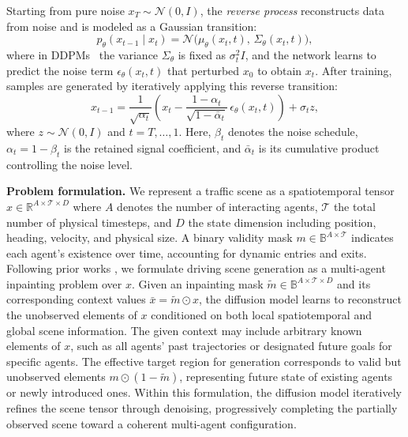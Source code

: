 \documentclass[10pt,twocolumn,letterpaper]{article}
\theoremstyle{plain}
\theoremstyle{remark}
\renewcommand{\paragraph}[1]{\vspace{.5em}\noindent\textbf{#1.}}
\begin{document}
Starting from pure noise $x_T \!\sim\! \mathcal{N}(0,I)$, the \textit{reverse process} reconstructs data from noise and is modeled as a Gaussian transition:
\begin{equation}
p_\theta(x_{t-1}\mid x_t)
= \mathcal{N}\!\big(\mu_\theta(x_t, t),\, \Sigma_\theta(x_t, t)\big),
\end{equation}
where in DDPMs~\cite{ho2020denoising} the variance $\Sigma_\theta$ is fixed as $\sigma_t^2 I$, 
and the network learns to predict the noise term $\epsilon_\theta(x_t, t)$ that perturbed $x_0$ to obtain $x_t$.
After training, samples are generated by iteratively applying this reverse transition:
\begin{equation}
x_{t-1}
= \frac{1}{\sqrt{\alpha_t}}
\!\left(x_t - \frac{1 - \alpha_t}{\sqrt{1 - \bar{\alpha}_t}}\,
\epsilon_\theta(x_t, t)\!\right)
+ \sigma_t z,
\label{eq:ddpm_sample}
\end{equation}
where $z \sim \mathcal{N}(0, I)$ and $t = T, \ldots, 1$. Here, $\beta_t$ denotes the noise schedule, $\alpha_t = 1 - \beta_t$ is the retained signal coefficient, and $\bar{\alpha}_t$ is its cumulative product controlling the noise level.

\paragraph{Problem formulation}
We represent a traffic scene as a spatiotemporal tensor \( x \in \mathbb{R}^{A \times \mathcal{T} \times D} \)
where \( A \) denotes the number of interacting agents, \( \mathcal{T} \) the total number of physical timesteps, and \( D \) the state dimension including position, heading, velocity, and physical size. 
A binary validity mask \( m \in \mathbb{B}^{A \times \mathcal{T}} \) indicates each agent’s existence over time, accounting for dynamic entries and exits.
Following prior works \cite{jiang2024scenediffuser, zhou2025decoupled}, we formulate driving scene generation as a multi-agent inpainting problem over $x$.
Given an inpainting mask \( \tilde{m} \in \mathbb{B}^{A \times \mathcal{T} \times D} \) and its corresponding context values \( \bar{x} = \tilde{m} \odot x \), the diffusion model learns to reconstruct the unobserved elements of \( x \) conditioned on both local spatiotemporal and global scene information.
The given context may include arbitrary known elements of $x$, such as all agents’ past trajectories or designated future goals for specific agents. 
The effective target region for generation corresponds to valid but unobserved elements \( m \odot (1-\tilde{m}) \), representing future state of existing agents or newly introduced ones. Within this formulation, the diffusion model iteratively refines the scene tensor through denoising, progressively completing the partially observed scene toward a coherent multi-agent configuration. 
\end{document}
